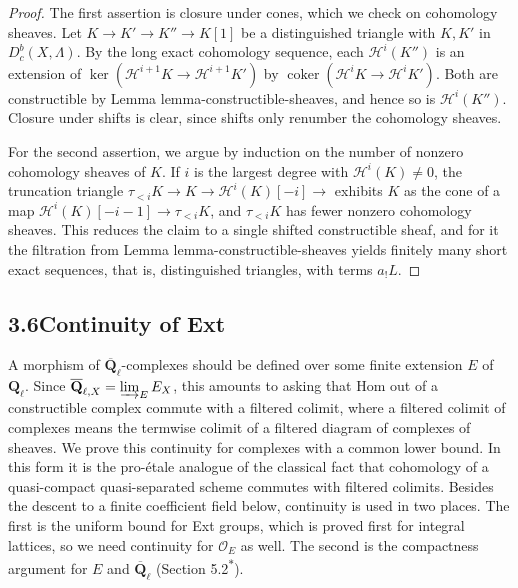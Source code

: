 \documentclass[11pt]{article}
\newcommand{\bpout}[1]{#1\textsuperscript{\hyperlink{bp-outside}{\ensuremath{\ast}}}}
\providecommand{\Dbc}{}\renewcommand{\Dbc}{D^b_c}
\providecommand{\QbarX}{}\renewcommand{\QbarX}{\overline{\mathbf Q}_{\ell,X}}
\providecommand{\coker}{}\renewcommand{\coker}{\operatorname{coker}}
\begin{document}
\begin{proof}[{Proof}]\label{bp62}%
The first assertion is closure under cones, which we check on cohomology sheaves. Let \(K\to K'\to K''\to K[1]\) be a distinguished triangle with \(K,K'\) in \(\Dbc(X,\Lambda)\). By the long exact cohomology sequence, each \(\mathcal H^i(K'')\) is an extension of \(\ker(\mathcal H^{i+1}K\to\mathcal H^{i+1}K')\) by \(\coker(\mathcal H^iK\to\mathcal H^iK')\). Both are constructible by Lemma lemma-constructible-sheaves, and hence so is \(\mathcal H^i(K'')\). Closure under shifts is clear, since shifts only renumber the cohomology sheaves.

For the second assertion, we argue by induction on the number of nonzero cohomology sheaves of \(K\). If \(i\) is the largest degree with \(\mathcal H^i(K)\ne0\), the truncation triangle \(\tau_{<i}K\to K\to\mathcal H^i(K)[-i]\to\) exhibits \(K\) as the cone of a map \(\mathcal H^i(K)[-i-1]\to\tau_{<i}K\), and \(\tau_{<i}K\) has fewer nonzero cohomology sheaves. This reduces the claim to a single shifted constructible sheaf, and for it the filtration from Lemma lemma-constructible-sheaves yields finitely many short exact sequences, that is, distinguished triangles, with terms \(a_!L\).
\end{proof}


\subsection*{\texorpdfstring{3.6\quad Continuity of Ext}{3.6 Continuity of Ext}}
\label{bp63}%
\label{bp64}%
A morphism of \(\overline{\mathbf Q}_\ell\)-complexes should be defined over some finite extension \(E\) of \(\mathbf Q_\ell\). Since \(\QbarX=\varinjlim_EE_X\), this amounts to asking that Hom out of a constructible complex commute with a filtered colimit, where a filtered colimit of complexes means the termwise colimit of a filtered diagram of complexes of sheaves. We prove this continuity for complexes with a common lower bound. In this form it is the pro-étale analogue of the classical fact that cohomology of a quasi-compact quasi-separated scheme commutes with filtered colimits. Besides the descent to a finite coefficient field below, continuity is used in two places. The first is the uniform bound for Ext groups, which is proved first for integral lattices, so we need continuity for \(\mathcal O_E\) as well. The second is the compactness argument for \(E\) and \(\overline{\mathbf Q}_\ell\) (Section \bpout{5.2}).
\end{document}
